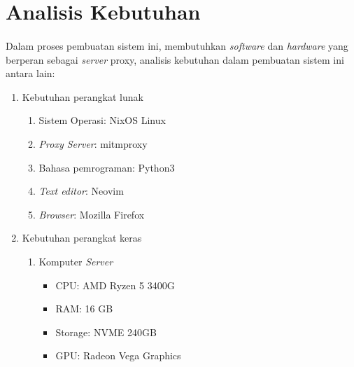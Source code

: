 \documentclass[./bab_3.tex]{subfiles}
\begin{document}
  \section{Analisis Kebutuhan}
  \paragraph*{}Dalam proses pembuatan sistem ini, membutuhkan
  \textit{software} dan \textit{hardware} yang berperan
  sebagai \textit{server} proxy, analisis kebutuhan dalam
  pembuatan sistem ini antara lain:
  \begin{enumerate}
    \item Kebutuhan perangkat lunak
    \begin{enumerate}
      \item Sistem Operasi: NixOS Linux
      \item \textit{Proxy Server}: mitmproxy
      \item Bahasa pemrograman: Python3
      \item \textit{Text editor}: Neovim
      \item \textit{Browser}: Mozilla Firefox
    \end{enumerate}
    \item Kebutuhan perangkat keras
    \begin{enumerate}
      \item Komputer \textit{Server}
      \begin{itemize}
        \item CPU: AMD Ryzen 5 3400G
        \item RAM: 16 GB
        \item Storage: NVME 240GB
        \item GPU: Radeon Vega Graphics
      \end{itemize}
    \end{enumerate}
  \end{enumerate}
\end{document}
